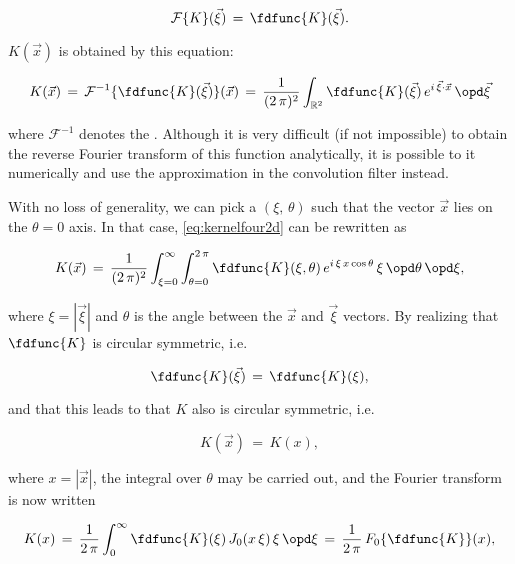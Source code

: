 \begin{equation}
\mathcal{F}\{K\}(\vec{\xi}) \,=\, \fdfunc{K}(\vec{\xi}).
\end{equation}

$K(\vec{x})$ is obtained by  this equation:

\begin{equation} \label{eq:kernelfour2d}
K(\vec{x}) \,=\, \mathcal{F}^{-1}\{\fdfunc{K}(\vec{\xi})\}(\vec{x}) \,=\, \frac{1}{(2\,\pi)^2}\int_{\mathbb{R}^2}\fdfunc{K}(\vec{\xi})\,e^{i\,\vec{\xi}\cdot\vec{x}}\,\opd\vec{\xi}
\end{equation}

where $\mathcal{F}^{-1}$ denotes the . Although it is very difficult (if not impossible) to obtain the reverse Fourier transform of this function analytically, it is possible to  it numerically and use the approximation in the convolution filter instead.

With no loss of generality, we can pick a  $(\xi,\,\theta)$ such that the vector $\vec{x}$ lies on the $\theta = 0$ axis. In that case, \eqref{eq:kernelfour2d} can be rewritten as

\begin{equation}
K(\vec{x}) \,=\, \frac{1}{(2\,\pi)^2}\int_{\xi=0}^\infty\int_{\theta=0}^{2\,\pi}\fdfunc{K}(\xi, \theta)\,e^{i\,\xi\,x\cos\theta}\,\xi\,\opd\theta\,\opd\xi,
\end{equation}

where $\xi = |\vec{\xi}|$ and $\theta$ is the angle between the $\vec{x}$ and $\vec{\xi}$ vectors. By realizing that $\fdfunc{K}$ is circular symmetric, i.e.

\begin{equation}
\fdfunc{K}(\vec{\xi}) \,=\, \fdfunc{K}(\xi),
\end{equation}

and that this leads to that $K$ also is circular symmetric, i.e.

\begin{equation}
K(\vec{x}) \,=\, K(x),
\end{equation}

where $x = |\vec{x}|$, the integral over $\theta$ may be carried out, and the Fourier transform is now written

\begin{equation} \label{eq:fdkerneltokernel}
K(x) \,=\, \frac{1}{2\,\pi}\int_0^\infty\fdfunc{K}(\xi)\,J_0(x\,\xi)\,\xi\,\opd\xi \,=\, \frac{1}{2\,\pi}\,F_0\{\fdfunc{K}\}(x),
\end{equation}

